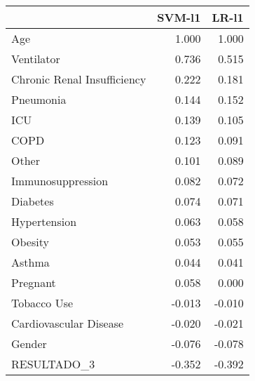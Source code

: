 \begin{tabular}{lrr}
\toprule
{} &  SVM-l1 &  LR-l1 \\
\midrule
Age                         &   1.000 &  1.000 \\
Ventilator                  &   0.736 &  0.515 \\
Chronic Renal Insufficiency &   0.222 &  0.181 \\
Pneumonia                   &   0.144 &  0.152 \\
ICU                         &   0.139 &  0.105 \\
COPD                        &   0.123 &  0.091 \\
Other                       &   0.101 &  0.089 \\
Immunosuppression           &   0.082 &  0.072 \\
Diabetes                    &   0.074 &  0.071 \\
Hypertension                &   0.063 &  0.058 \\
Obesity                     &   0.053 &  0.055 \\
Asthma                      &   0.044 &  0.041 \\
Pregnant                    &   0.058 &  0.000 \\
Tobacco Use                 &  -0.013 & -0.010 \\
Cardiovascular Disease      &  -0.020 & -0.021 \\
Gender                      &  -0.076 & -0.078 \\
RESULTADO\_3                 &  -0.352 & -0.392 \\
\bottomrule
\end{tabular}

